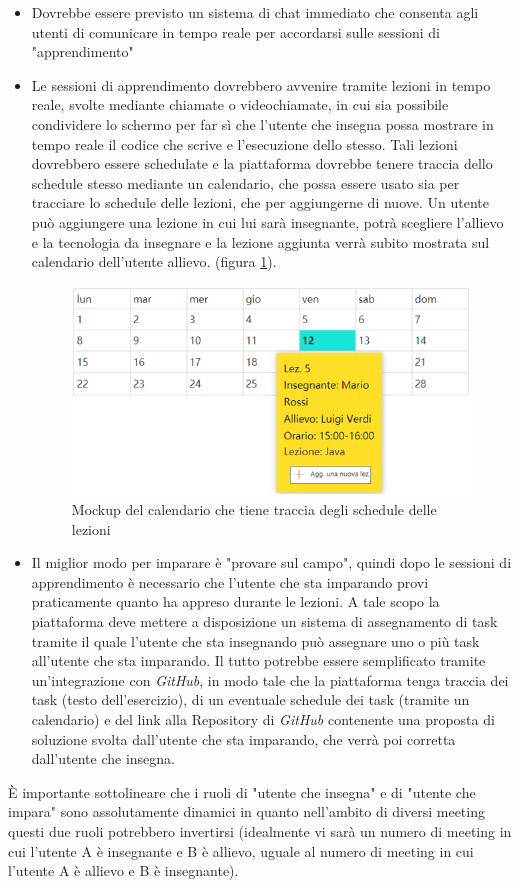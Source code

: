 \begin{itemize}
    \item Dovrebbe essere previsto un sistema di chat immediato che consenta agli utenti di comunicare in tempo reale per accordarsi sulle sessioni di "apprendimento"
    \item Le sessioni di apprendimento dovrebbero avvenire tramite lezioni in tempo reale, svolte mediante chiamate o videochiamate, in cui sia possibile condividere lo schermo per far sì che l’utente che insegna possa mostrare in tempo reale il codice che scrive e l’esecuzione dello stesso. Tali lezioni dovrebbero essere schedulate e la piattaforma dovrebbe tenere traccia dello schedule stesso mediante un calendario, che possa essere usato sia per tracciare lo schedule delle lezioni, che per aggiungerne di nuove. Un utente può aggiungere una lezione in cui lui sarà insegnante, potrà scegliere l’allievo e la tecnologia da insegnare e la lezione aggiunta verrà subito mostrata sul calendario dell'utente allievo. (figura \ref{fig:calendario}).
    \begin{figure}[!ht]
        \includegraphics[width=\textwidth]{capitoli/images/calendario.png}
        \caption{Mockup del calendario che tiene traccia degli schedule delle lezioni}
        \label{fig:calendario}
    \end{figure}
    \item Il miglior modo per imparare è "provare sul campo", quindi dopo le sessioni di apprendimento è necessario che l’utente che sta imparando provi praticamente quanto ha appreso durante le lezioni. A tale scopo la piattaforma deve mettere a disposizione un sistema di assegnamento di task tramite il quale l’utente che sta insegnando può assegnare uno o più task all’utente che sta imparando. Il tutto potrebbe essere semplificato tramite un’integrazione con \emph{GitHub}, in modo tale che la piattaforma tenga traccia dei task (testo dell’esercizio), di un eventuale schedule dei task (tramite un calendario) e del link alla Repository di \emph{GitHub} contenente una proposta di soluzione svolta dall’utente che sta imparando, che verrà poi corretta dall’utente che insegna.
\end{itemize}
È importante sottolineare che i ruoli di "utente che insegna" e di "utente che impara" sono assolutamente dinamici in quanto nell’ambito di diversi meeting questi due ruoli potrebbero invertirsi (idealmente vi sarà un numero di meeting in cui l’utente A è insegnante e B è allievo, uguale al numero di meeting in cui l’utente A è allievo e B è insegnante). 
